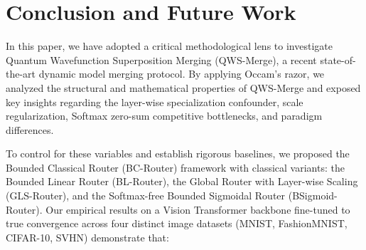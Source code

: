 \section{Conclusion and Future Work}
\label{sec:conclusion}

In this paper, we have adopted a critical methodological lens to investigate Quantum Wavefunction Superposition Merging (QWS-Merge), a recent state-of-the-art dynamic model merging protocol. By applying Occam's razor, we analyzed the structural and mathematical properties of QWS-Merge and exposed key insights regarding the layer-wise specialization confounder, scale regularization, Softmax zero-sum competitive bottlenecks, and paradigm differences.

To control for these variables and establish rigorous baselines, we proposed the Bounded Classical Router (BC-Router) framework with classical variants: the Bounded Linear Router (BL-Router), the Global Router with Layer-wise Scaling (GLS-Router), and the Softmax-free Bounded Sigmoidal Router (BSigmoid-Router). Our empirical results on a Vision Transformer backbone fine-tuned to true convergence across four distinct image datasets (MNIST, FashionMNIST, CIFAR-10, SVHN) demonstrate that:
